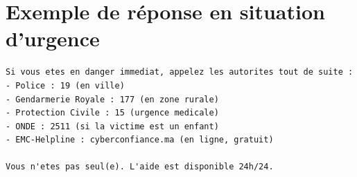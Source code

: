\documentclass[a4paper,11pt,twoside]{report}
\begin{document}
\section{Exemple de réponse en situation d'urgence}

\begin{lstlisting}[caption={Réponse renvoyée sans appel au modèle de langage},label={lst:urgence}]
Si vous etes en danger immediat, appelez les autorites tout de suite :
- Police : 19 (en ville)
- Gendarmerie Royale : 177 (en zone rurale)
- Protection Civile : 15 (urgence medicale)
- ONDE : 2511 (si la victime est un enfant)
- EMC-Helpline : cyberconfiance.ma (en ligne, gratuit)

Vous n'etes pas seul(e). L'aide est disponible 24h/24.
\end{lstlisting}
\end{document}
